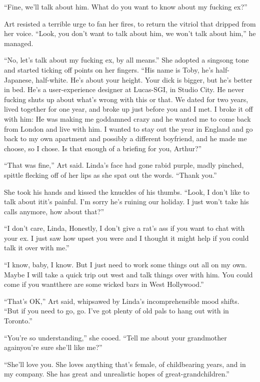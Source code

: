 “Fine, we’ll talk about him. What do you want to know about my
fucking ex?”

Art resisted a terrible urge to fan her fires, to return the
vitriol that dripped from her voice. “Look, you don’t want to talk
about him, we won’t talk about him,” he managed.

“No, let’s talk about my fucking ex, by all means.” She adopted a
singsong tone and started ticking off points on her fingers. “His
name is Toby, he’s half-Japanese, half-white. He’s about your
height. Your dick is bigger, but he’s better in bed. He’s a
user-experience designer at Lucas-SGI, in Studio City. He never
fucking shuts up about what’s wrong with this or that. We dated for
two years, lived together for one year, and broke up just before
you and I met. I broke it off with him: He was making me goddamned
crazy and he wanted me to come back from London and live with him.
I wanted to stay out the year in England and go back to my own
apartment and possibly a different boyfriend, and he made me
choose, so I chose. Is that enough of a briefing for you, Arthur?”

“That was fine,” Art said. Linda’s face had gone rabid purple,
madly pinched, spittle flecking off of her lips as she spat out the
words. “Thank you.”

She took his hands and kissed the knuckles of his thumbs. “Look, I
don’t like to talk about it{\dash}it’s painful. I’m sorry he’s ruining
our holiday. I just won’t take his calls anymore, how about that?”

“I don’t care, Linda, Honestly, I don’t give a rat’s ass if you
want to chat with your ex. I just saw how upset you were and I
thought it might help if you could talk it over with me.”

“I know, baby, I know. But I just need to work some things out all
on my own. Maybe I will take a quick trip out west and talk things
over with him. You could come if you want{\dash}there are some wicked
bars in West Hollywood.”

“That’s OK,” Art said, whipsawed by Linda’s incomprehensible mood
shifts. “But if you need to go, go. I’ve got plenty of old pals to
hang out with in Toronto.”

“You’re so understanding,” she cooed. “Tell me about your
grandmother again{\dash}you’re sure she’ll like me?”

“She’ll love you. She loves anything that’s female, of childbearing
years, and in my company. She has great and unrealistic hopes of
great-grand\-child\-ren.”

